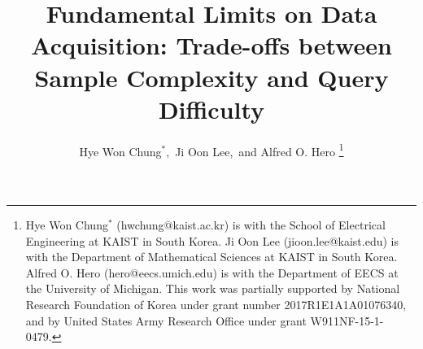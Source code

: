 \documentclass[11pt,onecolumn]{IEEEtran}
\begin{document}
%
\title{Fundamental Limits on Data Acquisition: Trade-offs between Sample Complexity and Query Difficulty}

\author{Hye Won Chung$^*$,~Ji Oon Lee,~and Alfred O. Hero%
\thanks{Hye Won Chung$^*$ (hwchung@kaist.ac.kr) is with the School of Electrical Engineering at KAIST in South Korea. Ji Oon Lee (jioon.lee@kaist.edu) is with the Department of Mathematical Sciences at KAIST in South Korea. Alfred O. Hero (hero@eecs.umich.edu) is with the Department of EECS at the University of Michigan. This work was partially supported by National Research Foundation of Korea under grant number 2017R1E1A1A01076340, and by United States Army Research Office under grant W911NF-15-1-0479. 
}}

\maketitle


\end{document}
